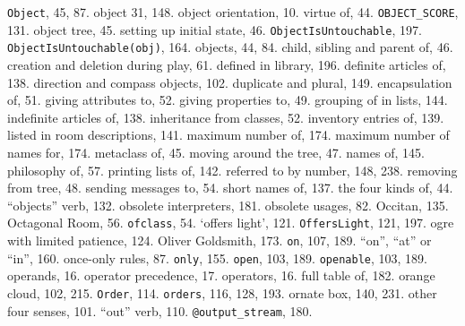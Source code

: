 {{\tt Object}}, 45, 87.
object 31, 148.
object orientation, 10.
\quad  virtue of, 44.
{{\tt OBJECT\_SCORE}}, 131.
object tree, 45.
\quad  setting up initial state, 46.
{{\tt ObjectIsUntouchable}}, 197.
{{\tt ObjectIsUntouchable(obj)}}, 164.
objects, 44, 84.
\quad  child, sibling and parent of, 46.
\quad  creation and deletion during play, 61.
\quad  defined in library, 196.
\quad  definite articles of, 138.
\quad  direction and compass objects, 102.
\quad  duplicate and plural, 149.
\quad  encapsulation of, 51.
\quad  giving attributes to, 52.
\quad  giving properties to, 49.
\quad  grouping of in lists, 144.
\quad  indefinite articles of, 138.
\quad  inheritance from classes, 52.
\quad  inventory entries of, 139.
\quad  listed in room descriptions, 141.
\quad  maximum number of, 174.
\quad  maximum number of names for, 174.
\quad  metaclass of, 45.
\quad  moving around the tree, 47.
\quad  names of, 145.
\quad  philosophy of, 57.
\quad  printing lists of, 142.
\quad  referred to by number, 148, 238.
\quad  removing from tree, 48.
\quad  sending messages to, 54.
\quad  short names of, 137.
\quad  the four kinds of, 44.
``objects'' verb, 132.
obsolete interpreters, 181.
obsolete usages, 82.
Occitan, 135.
Octagonal Room, 56.
{{\tt ofclass}}, 54.
`offers light', 121.
{{\tt OffersLight}}, 121, 197.
ogre with limited patience, 124.
Oliver Goldsmith, 173.
{{\tt on}}, 107, 189.
``on'', ``at'' or ``in'', 160.
once-only rules, 87.
{{\tt only}}, 155.
{{\tt open}}, 103, 189.
{{\tt openable}}, 103, 189.
operands, 16.
operator precedence, 17.
operators, 16.
\quad  full table of, 182.
orange cloud, 102, 215.
{{\tt Order}}, 114.
{{\tt orders}}, 116, 128, 193.
ornate box, 140, 231.
other four senses, 101.
``out'' verb, 110.
{{\tt @output\_stream}}, 180.

